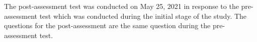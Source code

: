 

\parx
The post-assessment test was conducted on May 25, 2021 in response to the
pre-assessment test which was conducted during the initial stage of the study. The
questions for the post-assessment are the same question during the pre-assessment
test.



